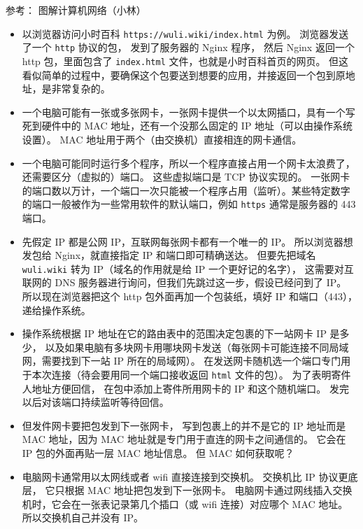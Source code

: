 
\begin{issues}
\issueDraft
\end{issues}

参考： 图解计算机网络（小林）

\begin{itemize}
\item 以浏览器访问小时百科 \verb`https://wuli.wiki/index.html` 为例。 浏览器发送了一个 \verb`http` 协议的包， 发到了服务器的 Nginx 程序， 然后 Nginx 返回一个 http 包，里面包含了 \verb`index.html` 文件，也就是小时百科首页的网页。 但这看似简单的过程中，要确保这个包要送到想要的应用，并接返回一个包到原地址，是非常复杂的。
\item 一个电脑可能有一张或多张网卡，一张网卡提供一个以太网插口，具有一个写死到硬件中的 MAC 地址，还有一个没那么固定的 IP 地址（可以由操作系统设置）。 MAC 地址用于两个（由交换机）直接相连的网卡通信。
\item 一个电脑可能同时运行多个程序，所以一个程序直接占用一个网卡太浪费了，还需要区分（虚拟的）端口。 这些虚拟端口是 TCP 协议实现的。 一张网卡的端口数以万计，一个端口一次只能被一个程序占用（监听）。某些特定数字的端口一般被作为一些常用软件的默认端口，例如 \verb`https` 通常是服务器的 443 端口。
\item 先假定 IP 都是公网 IP，互联网每张网卡都有一个唯一的 IP。 所以浏览器想发包给 Nginx，就直接指定 IP 和端口即可精确送达。 但要先把域名 \verb`wuli.wiki` 转为 IP（域名的作用就是给 IP 一个更好记的名字）， 这需要对互联网的 DNS 服务器进行询问，但我们先跳过这一步，假设已经问到了 IP。 所以现在浏览器把这个 http 包外面再加一个包装纸，填好 IP 和端口（443），递给操作系统。
\item 操作系统根据 IP 地址在它的路由表中的范围决定包裹的下一站网卡 IP 是多少， 以及如果电脑有多块网卡用哪块网卡发送（每张网卡可能连接不同局域网，需要找到下一站 IP 所在的局域网）。 在发送网卡随机选一个端口专门用于本次连接（待会要用同一个端口接收返回 \verb`html` 文件的包）。 为了表明寄件人地址方便回信， 在包中添加上寄件所用网卡的 IP 和这个随机端口。 发完以后对该端口持续监听等待回信。
\item 但发件网卡要把包发到下一张网卡， 写到包裹上的并不是它的 IP 地址而是 MAC 地址，因为 MAC 地址就是专门用于直连的网卡之间通信的。 它会在 IP 包的外面再贴一层 MAC 地址信息。 但 MAC 如何获取呢？
\item 电脑网卡通常用以太网线或者 wifi 直接连接到交换机。 交换机比 IP 协议更底层， 它只根据 MAC 地址把包发到下一张网卡。 电脑网卡通过网线插入交换机时，它会在一张表记录第几个插口（或 wifi 连接）对应哪个 MAC 地址。 所以交换机自己并没有 IP。

\end{itemize}
